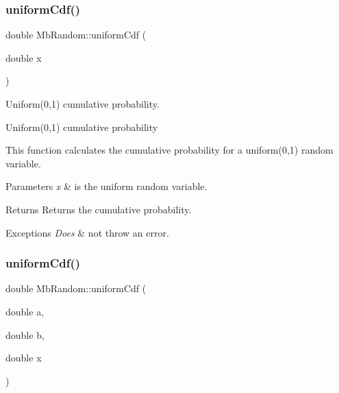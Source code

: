 \subsubsection{\texorpdfstring{uniformCdf()}{uniformCdf()}\hspace{0.1cm}{\footnotesize\ttfamily [1/2]}}
{\footnotesize\ttfamily double Mb\+Random\+::uniform\+Cdf (\begin{DoxyParamCaption}\item[{double}]{x }\end{DoxyParamCaption})}



Uniform(0,1) cumulative probability. 

Uniform(0,1) cumulative probability

This function calculates the cumulative probability for a uniform(0,1) random variable.


\begin{DoxyParams}{Parameters}
{\em x} & is the uniform random variable. \\
\hline
\end{DoxyParams}
\begin{DoxyReturn}{Returns}
Returns the cumulative probability. 
\end{DoxyReturn}

\begin{DoxyExceptions}{Exceptions}
{\em Does} & not throw an error. \\
\hline
\end{DoxyExceptions}
\mbox{\label{class_mb_random_adbc7c859738c1cc4bcf485fc835db98e}} 
\subsubsection{\texorpdfstring{uniformCdf()}{uniformCdf()}\hspace{0.1cm}{\footnotesize\ttfamily [2/2]}}
{\footnotesize\ttfamily double Mb\+Random\+::uniform\+Cdf (\begin{DoxyParamCaption}\item[{double}]{a,  }\item[{double}]{b,  }\item[{double}]{x }\end{DoxyParamCaption})\hspace{0.3cm}{\ttfamily [inline]}}



